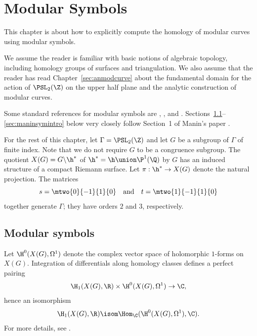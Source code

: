 \documentclass{report}
\begin{document}



\chapter{Modular Symbols}
This chapter is about how to explicitly compute the homology of
modular curves  using modular symbols.

We assume the reader is familiar with basic notions of algebraic
topology, including homology groups of surfaces and triangulation.  We
also assume that the reader has read Chapter~\ref{sec:anmodcurve}
about the fundamental domain for the action of $\PSL_2(\Z)$ on the
upper half plane and the analytic construction of modular curves.

Some standard references for modular symbols are
\cite{manin:parabolic} \cite[IV]{lang:modular},
\cite{cremona:algs}, and \cite{merel:1585}.
Sections~\ref{sec:modsymintro}--\ref{sec:maninsymintro} below very
closely follow Section~1 of Manin's paper \cite{manin:parabolic}.

For the rest of this chapter, let $\Gamma=\PSL_2(\Z)$ and let $G$
be a subgroup of $\Gamma$ of finite index. Note that we do not
require $G$ to be a congruence subgroup.  The quotient
$X(G)=G\backslash\h^*$ of $\h^*=\h\union\P^1(\Q)$ by $G$ has an
induced structure of a compact Riemann surface.  Let $\pi:\h^*\to
X(G)$ denote the natural projection.  The matrices
$$s=\mtwo{0}{-1}{1}{\hfill0}\quad\text{and}\quad t=\mtwo{1}{-1}{1}{0}$$
together generate $\Gamma$; they have orders $2$ and $3$,
respectively.

\section{Modular symbols}\label{sec:modsymintro}
Let $\H^0(X(G),\Omega^1)$ denote the complex vector space of
holomorphic $1$-forms on $X(G)$.  Integration of differentials
along homology classes defines a perfect  pairing
\[
  \H_1(X(G),\R) \times \H^0(X(G),\Omega^1) \to \C,
\]
hence an isomorphism
$$\H_1(X(G),\R) \isom \Hom_{\C}(\H^0(X(G),\Omega^1),\C).$$
For more details, see \cite[\S{}IV.1]{lang:modular}.
\end{document}
